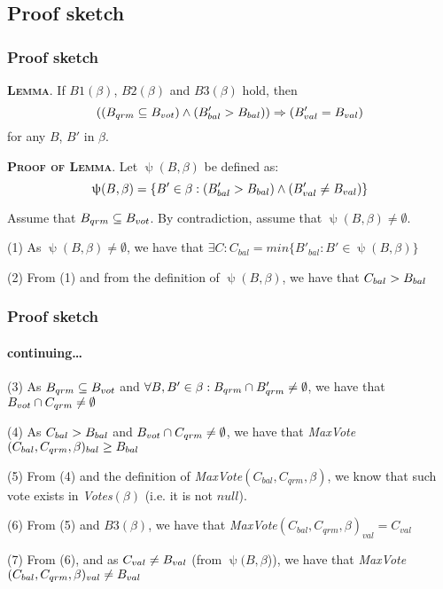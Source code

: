 \documentclass{beamer}
\begin{document}
\subsection{Proof sketch}


\begin{frame}
\frametitle{Proof sketch}

\textsc{\textbf{Lemma}}. If $B1(\beta)$, $B2(\beta)$ and $B3(\beta)$ hold, then $$((B_{qrm} \subseteq B_{vot}) \wedge (B'_{bal} > B_{bal})) \Rightarrow (B'_{val} = B_{val})$$ for any $B$, $B'$ in $\beta$.

\vspace{3 mm}
\textsc{\textbf{Proof of Lemma}}. Let $\uppsi(B, \beta)$ be defined as: $$\uppsi(B, \beta) = \{B' \in \beta : (B'_{bal} > B_{bal}) \wedge (B'_{val} \neq B_{val})\}$$


Assume that $B_{qrm} \subseteq B_{vot}$. By contradiction, assume that $\uppsi(B, \beta) \neq \emptyset$.

\vspace{3 mm}
(1) As $\uppsi(B, \beta) \neq \emptyset$, we have that $\exists C : C_{bal} = min\{B'_{bal} : B' \in \uppsi(B, \beta)\}$

(2) From (1) and from the definition of $\uppsi(B, \beta)$, we have that $C_{bal} > B_{bal}$

\end{frame}

\begin{frame}
\frametitle{Proof sketch}
\framesubtitle{continuing\ldots}

(3) As $B_{qrm} \subseteq B_{vot}$ and $\forall B, B' \in \beta : B_{qrm} \cap B'_{qrm} \neq \emptyset$, we have that $B_{vot} \cap C_{qrm} \neq \emptyset$

\vspace{2 mm}
(4) As $C_{bal} > B_{bal}$ and $B_{vot} \cap C_{qrm} \neq \emptyset$, we have that \textit{MaxVote}$(C_{bal}, C_{qrm}, \beta)_{bal} \geq B_{bal}$

\vspace{2 mm}
(5) From (4) and the definition of \textit{MaxVote}$(C_{bal}, C_{qrm}, \beta)$, we know that such vote exists in \textit{Votes}$(\beta)$ (i.e. it is not $null$).

\vspace{2 mm}
(6) From (5) and $B3(\beta)$, we have that \textit{MaxVote}$(C_{bal}, C_{qrm}, \beta)_{val} = C_{val}$

\vspace{2 mm}
(7) From (6), and as $C_{val} \neq B_{val}$ (from $\uppsi(B, \beta$)), we have that \textit{MaxVote}$(C_{bal}, C_{qrm}, \beta)_{val} \neq B_{val}$

\end{frame}
\end{document}
